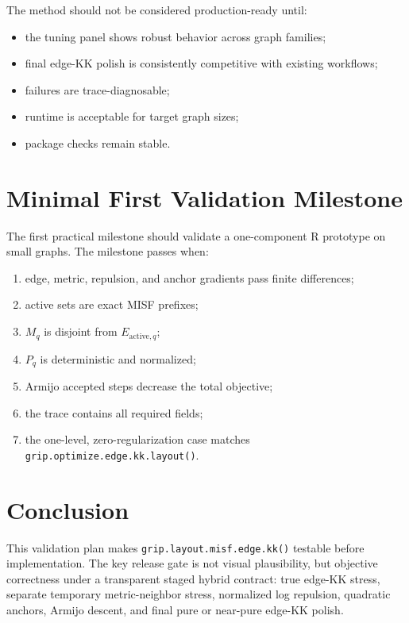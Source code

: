 \documentclass[11pt]{article}
\newcommand{\Rfunc}[1]{\texttt{#1}}
\begin{document}
The method should not be considered production-ready until:
\begin{itemize}[leftmargin=2em]
  \item the tuning panel shows robust behavior across graph families;
  \item final edge-KK polish is consistently competitive with existing
  workflows;
  \item failures are trace-diagnosable;
  \item runtime is acceptable for target graph sizes;
  \item package checks remain stable.
\end{itemize}

\section{Minimal First Validation Milestone}

The first practical milestone should validate a one-component R prototype on
small graphs. The milestone passes when:
\begin{enumerate}[leftmargin=2em]
  \item edge, metric, repulsion, and anchor gradients pass finite differences;
  \item active sets are exact MISF prefixes;
  \item \(M_q\) is disjoint from \(E_{\mathrm{active},q}\);
  \item \(P_q\) is deterministic and normalized;
  \item Armijo accepted steps decrease the total objective;
  \item the trace contains all required fields;
  \item the one-level, zero-regularization case matches
  \Rfunc{grip.optimize.edge.kk.layout()}.
\end{enumerate}

\section{Conclusion}

This validation plan makes \Rfunc{grip.layout.misf.edge.kk()} testable before
implementation. The key release gate is not visual plausibility, but objective
correctness under a transparent staged hybrid contract: true edge-KK stress,
separate temporary metric-neighbor stress, normalized log repulsion, quadratic
anchors, Armijo descent, and final pure or near-pure edge-KK polish.
\end{document}
